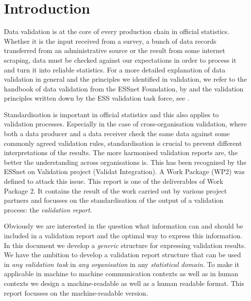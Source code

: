 \section{Introduction}
\label{sect:introduction}

Data validation is at the core of every production chain in official
statistics.  Whether it is the input received from a survey, a bunch of data
records transferred from an administrative source or the result from some
internet scraping, data must be checked against our expectations in order to
process it and turn it into reliable statistics.  For a more detailed
explanation of data validation in general and the principles we identified in
validation, we refer to the handbook of data validation from the ESSnet
Foundation, by \citet{zio2015methodology} and the validation principles written down
by the ESS validation task force, see \citet[Chapter 4]{ess2017}.

Standardisation is important in official statistics and this also applies to
validation processes.  Especially in the case of cross-organisation validation,
where both a data producer and a data receiver check the same data against some
commonly agreed validation rules, standardisation is crucial to prevent
different interpretations of the results.  The more harmonised validation
reports are, the better the understanding across organisations is.  This has
been recognized by the ESSnet on Validation project (Validat Integration).  A
Work Package (WP2) was defined to attack this issue.  This report is one of the
deliverables of Work Package 2.  It contains the result of the work carried out
by various project partners and focusses on the standardisation of the output
of a validation process: the \emph{validation report}.

Obviously we are interested in the question what information can and should be
included in a validation report and the optimal way to express this
information.  In this document we develop a \emph{generic} structure for
expressing validation results.  We have the ambition to develop a validation
report structure that can be used in \emph{any validation task} in \emph{any
organisation} in any \emph{statistical domain}.  To make it applicable in
machine to machine communication contexts as well as in human contexts we
design a machine-readable as well as a human readable format.
This report focusses on the machine-readable version.

